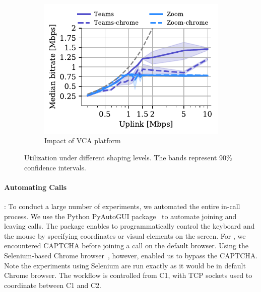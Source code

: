 \begin{figure}[ht!]
\begin{subfigure}[t]{0.33\textwidth}
\centering
    \includegraphics[width=\textwidth,keepaspectratio]{figures/static/uplink_browser.pdf}
    \caption{Impact of VCA platform %
    }
	\label{subfig:uplink_browser}
\end{subfigure} 
\caption{Utilization under different shaping levels. The bands represent 90\% confidence intervals.}
\label{fig:static}
\end{figure}

\paragraph{Automating Calls}: To conduct a large number of experiments, we automated the entire in-call process. %
We use the Python PyAutoGUI package~\cite{pyautogui} to automate joining and leaving calls. The package enables to programmatically control the keyboard and the mouse by specifying coordinates or visual elements on the screen. For \zoombrowser, we encountered CAPTCHA before joining a call on the default browser. Using the Selenium-based Chrome browser~\cite{selenium}, however, enabled us to bypass the CAPTCHA. Note the experiments using Selenium are run exactly as it would be in default Chrome browser. The workflow is controlled from C1, 
  with TCP sockets used to coordinate between C1 and C2. 





